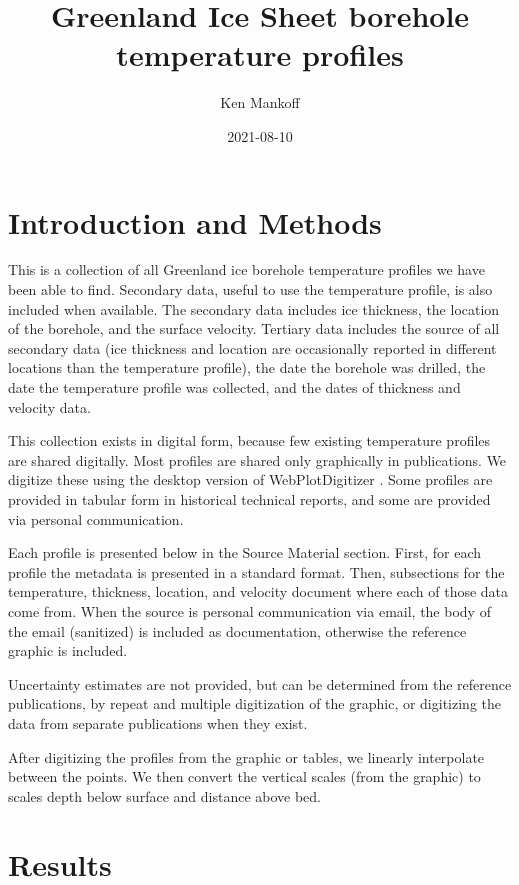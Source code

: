 \documentclass[article,a4paper,times,11pt,twoside]{article}
\author{Ken Mankoff}
\date{2021-08-10}
\title{Greenland Ice Sheet borehole temperature profiles}
\begin{document}
\maketitle
\setcounter{tocdepth}{2}
\tableofcontents


\clearpage
\section{Introduction and Methods}
\label{sec:org378e4d5}
This is a collection of all Greenland ice borehole temperature profiles we have been able to find. Secondary data, useful to use the temperature profile, is also included when available. The secondary data includes ice thickness, the location of the borehole, and the surface velocity. Tertiary data includes the source of all secondary data (ice thickness and location are occasionally reported in different locations than the temperature profile), the date the borehole was drilled, the date the temperature profile was collected, and the dates of thickness and velocity data.

This collection exists in digital form, because few existing temperature profiles are shared digitally. Most profiles are shared only graphically in publications. We digitize these using the desktop version of WebPlotDigitizer \autocite{WPD}. Some profiles are provided in tabular form in historical technical reports, and some are provided via personal communication.

Each profile is presented below in the Source Material section. First, for each profile the metadata is presented in a standard format. Then, subsections for the temperature, thickness, location, and velocity document where each of those data come from. When the source is personal communication via email, the body of the email (sanitized) is included as documentation, otherwise the reference graphic is included.

Uncertainty estimates are not provided, but can be determined from the reference publications, by repeat and multiple digitization of the graphic, or digitizing the data from separate publications when they exist.

After digitizing the profiles from the graphic or tables, we linearly interpolate between the points. We then convert the vertical scales (from the graphic) to scales depth below surface and distance above bed.

\section{Results}
\label{sec:org92023c7}
\end{document}
